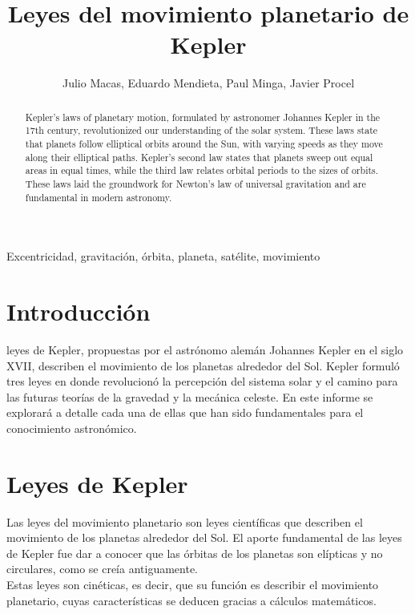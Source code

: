 \documentclass[journal]{IEEEtran}
\begin{document}
\title{Leyes del movimiento planetario de Kepler}

\author{Julio Macas, Eduardo Mendieta, Paul Minga, Javier Procel}

\maketitle

\begin{abstract}
Kepler's laws of planetary motion, formulated by astronomer Johannes Kepler in the 17th century, revolutionized our understanding of the solar system. These laws state that planets follow elliptical orbits around the Sun, with varying speeds as they move along their elliptical paths. Kepler's second law states that planets sweep out equal areas in equal times, while the third law relates orbital periods to the sizes of orbits. These laws laid the groundwork for Newton's law of universal gravitation and are fundamental in modern astronomy.

\end{abstract}

\begin{IEEEkeywords}
Excentricidad, gravitación, órbita,  planeta, satélite, movimiento
\end{IEEEkeywords}

\IEEEpeerreviewmaketitle

\section{Introducción}

 leyes de Kepler, propuestas por el astrónomo alemán Johannes Kepler en el siglo XVII, describen el movimiento de los planetas alrededor del Sol. Kepler formuló tres leyes en donde revolucionó la percepción del sistema solar y el camino para las futuras teorías de la gravedad y la mecánica celeste. En este informe se explorará a detalle cada una de ellas que han sido fundamentales para el conocimiento astronómico.

\section{Leyes de Kepler}
Las leyes del movimiento planetario son leyes científicas que describen el movimiento de los planetas alrededor del Sol. El aporte fundamental de las leyes de Kepler fue dar a conocer que las órbitas de los planetas son elípticas y no circulares, como se creía antiguamente.\\
Estas leyes son cinéticas, es decir, que su función es describir el movimiento planetario, cuyas características se deducen gracias a cálculos matemáticos.\cite{UNAM2023}
\end{document}
